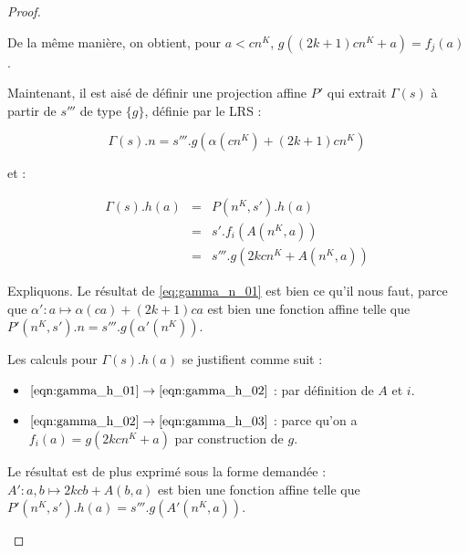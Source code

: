 \begin{appendices}
\begin{proof}
\begin{enumerate}[itemsep=-1mm,leftmargin=2cm]
					
				De la même manière, on obtient, pour $a < cn^K$, $g\left( (2k+1)cn^K + a\right) = f_j(a)$. 
				
				Maintenant, il est aisé de définir une projection affine $P'$ qui extrait $\Gamma(s)$ à partir de $s'''$ de type $\{g\}$, définie par le LRS :
				
				\begin{equation}
					\Gamma(s).n = s'''.g\left( \alpha\left( cn^K\right) + (2k+1)cn^K\right) \label{eq:gamma_n_01}
				\end{equation}
				
				et : 
				
				\begin{eqnarray}
					\Gamma(s).h(a) 	& = &	P\left( n^K, s' \right).h(a) \label{eqn:gamma_h_01}\\
									& = &	s'.f_i\left( A\left( n^K, a \right) \right) \label{eqn:gamma_h_02}\\
									& = & 	s'''.g\left( 2kcn^K + A\left( n^K, a \right) \right) \label{eqn:gamma_h_03}
				\end{eqnarray}
				
				Expliquons. Le résultat de \ref{eq:gamma_n_01} est bien ce qu'il nous faut, parce que $\alpha': a \mapsto \alpha\left(ca\right) + (2k+1)ca$ est bien une fonction affine telle que $P'\left(n^K, s'\right).n = s'''.g\left(\alpha'\left(n^K\right)\right)$.
				
				Les calculs pour $\Gamma(s).h(a)$ se justifient comme suit :
					\begin{itemize}
						\setlength{\itemsep}{-1mm}
						\item 	$\ref{eqn:gamma_h_01} \rightarrow \ref{eqn:gamma_h_02}$ : par définition de $A$ et $i$.
						\item 	$\ref{eqn:gamma_h_02} \rightarrow \ref{eqn:gamma_h_03}$ : parce qu'on a $f_i(a) = g\left( 2kcn^K + a \right)$ par construction de $g$.
					\end{itemize}

				
				Le résultat est de plus exprimé sous la forme demandée : $A' : a,b \mapsto 2kcb + A\left( b, a \right)$ est bien une fonction affine telle que $P'\left(n^K, s'\right).h(a) = s'''.g(A'(n^K, a))$.
			\end{enumerate}
			
			
		\end{proof}
		

\end{appendices}
